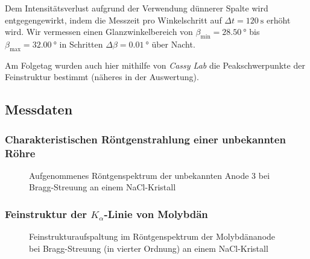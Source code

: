 \documentclass[11pt, a4paper]{article}
\begin{document}
Dem Intensitätsverlust aufgrund der Verwendung dünnerer Spalte wird entgegengewirkt, indem die Messzeit pro Winkelschritt auf $\Delta t = \SI{120}{\second}$ erhöht wird.
Wir vermessen einen Glanzwinkelbereich von $\beta_\mathrm{min} = \SI{28,50}{\degree}$ bis $\beta_\mathrm{max} = \SI{32,00}{\degree}$ in Schritten $\Delta \beta = \SI{0,01}{\degree}$ über Nacht.

Am Folgetag wurden auch hier mithilfe von \emph{Cassy Lab} die Peakschwerpunkte der Feinstruktur bestimmt (näheres in der Auswertung).

\subsection{Messdaten}
\subsubsection{Charakteristischen Röntgenstrahlung einer unbekannten Röhre}
\FloatBarrier

\begin{figure}[!h]
\centering
\resizebox{\columnwidth}{!}{%
}
\caption{Aufgenommenes Röntgenspektrum der unbekannten Anode 3 bei Bragg-Streuung an einem NaCl-Kristall}
\label{fig:anode3}
\end{figure}

\begin{table}[!h]
\centering

\caption{Peakschwerpunkte des charakteristischen Röntgenspektrums (Abbildung \ref{fig:anode3}) der unbekannten Anode}
\label{tab:peakschwerpunkt_grobstruktur}
\end{table}

\FloatBarrier
\subsubsection{Feinstruktur der $K_\alpha$-Linie von Molybdän}
\FloatBarrier
\begin{figure}[!h]
\centering
\resizebox{\columnwidth}{!}{%
}
\caption{Feinstrukturaufspaltung im Röntgenspektrum der Molybdänanode bei Bragg-Streuung (in vierter Ordnung) an einem NaCl-Kristall}
\label{fig:feinstruktur}
\end{figure}

\begin{table}[!h]
\centering

\caption{Peakschwerpunkte in der Feinstruktur der Molybdänanode (in vierter Ordnung)}
\label{tab:peakschwerpunkt_feinstruktur}
\end{table}
\FloatBarrier
\end{document}
